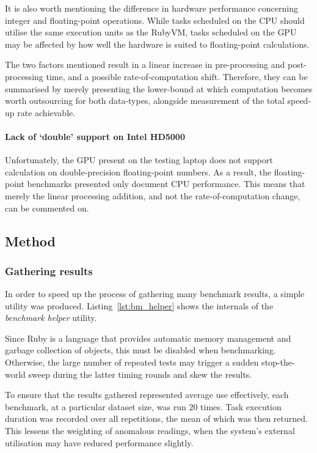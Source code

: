  It is also worth mentioning the difference in hardware performance concerning integer and floating-point operations. While tasks scheduled on the \ac{CPU} should utilise the same execution units as the RubyVM, tasks scheduled on the \ac{GPU} may be affected by how well the hardware is suited to floating-point calculations.

 The two factors mentioned result in a linear increase in pre-processing and post-processing time, and a possible rate-of-computation shift. Therefore, they can be summarised by merely presenting the lower-bound at which computation becomes worth outsourcing for both data-types, alongside measurement of the total speed-up rate achievable.

 \paragraph*{Lack of `double' support on Intel HD5000}
 Unfortunately, the \ac{GPU} present on the testing laptop does not support calculation on double-precision floating-point numbers.
 As a result, the floating-point benchmarks presented only document \ac{CPU} performance. This means that merely the linear processing addition, and not the rate-of-computation change, can be commented on.

\subsection{Method}
\subsubsection{Gathering results}
In order to speed up the process of gathering many benchmark results, a simple utility was produced. Listing~\ref{lst:bm_helper} shows the internals of the \emph{benchmark helper} utility.

Since Ruby is a language that provides automatic memory management and garbage collection of objects, this must be disabled when benchmarking. Otherwise, the large number of repeated tests may trigger a sudden stop-the-world sweep during the latter timing rounds and skew the results.

To ensure that the results gathered represented average use effectively, each benchmark, at a particular dataset size,  was run $20$ times. Task execution duration was recorded over all repetitions, the mean of which was then returned. This lessens the weighting of anomalous readings, when the system's external utilisation may have reduced performance slightly.


